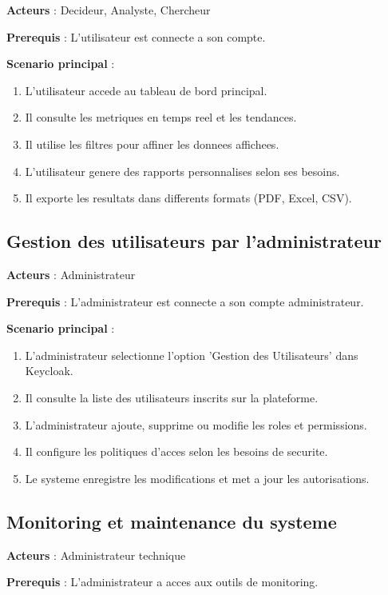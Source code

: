 \textbf{Acteurs} : Decideur, Analyste, Chercheur

\textbf{Prerequis} : L'utilisateur est connecte a son compte.

\textbf{Scenario principal} :
\begin{enumerate}
    \item L'utilisateur accede au tableau de bord principal.
    \item Il consulte les metriques en temps reel et les tendances.
    \item Il utilise les filtres pour affiner les donnees affichees.
    \item L'utilisateur genere des rapports personnalises selon ses besoins.
    \item Il exporte les resultats dans differents formats (PDF, Excel, CSV).
\end{enumerate}

\subsection{Gestion des utilisateurs par l'administrateur}

\textbf{Acteurs} : Administrateur

\textbf{Prerequis} : L'administrateur est connecte a son compte administrateur.

\textbf{Scenario principal} :
\begin{enumerate}
    \item L'administrateur selectionne l'option 'Gestion des Utilisateurs' dans Keycloak.
    \item Il consulte la liste des utilisateurs inscrits sur la plateforme.
    \item L'administrateur ajoute, supprime ou modifie les roles et permissions.
    \item Il configure les politiques d'acces selon les besoins de securite.
    \item Le systeme enregistre les modifications et met a jour les autorisations.
\end{enumerate}

\subsection{Monitoring et maintenance du systeme}

\textbf{Acteurs} : Administrateur technique

\textbf{Prerequis} : L'administrateur a acces aux outils de monitoring.

